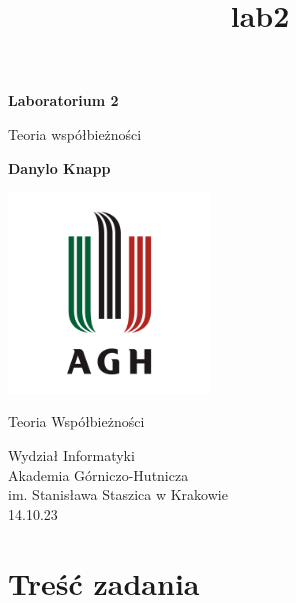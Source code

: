 \documentclass[11pt]{article}
\title{lab2}
\begin{document}
    
    \begin{titlepage}
        \begin{center}
            \vspace*{1cm}
    
            \textbf{Laboratorium 2}
    
            \vspace{0.5cm}
            Teoria współbieżności
                
            \vspace{1.5cm}
    
            \textbf{Danylo Knapp}

            \vfill

            \includegraphics[width=0.4\textwidth]{../report-templates/agh-logo.png}
    
            \vfill
                
            Teoria Współbieżności
                
            \vspace{0.8cm}

            Wydział Informatyki\\
            Akademia Górniczo-Hutnicza\\
            im. Stanisława Staszica w Krakowie\\
            14.10.23
                
        \end{center}
    \end{titlepage}
    
    

    
    \hypertarget{treux15bux107-zadania}{%
\section{Treść zadania}\label{treux15bux107-zadania}}
\end{document}
